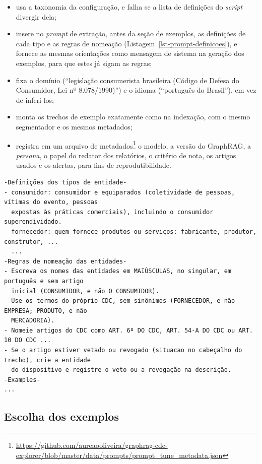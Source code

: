 \begin{itemize}
    \item usa a taxonomia da configuração, e falha se a lista de definições do \textit{script} divergir dela;
    \item insere no \textit{prompt} de extração, antes da seção de exemplos, as definições de cada tipo e as regras de nomeação (Listagem~\ref{lst-prompt-definicoes}), e fornece as mesmas orientações como mensagem de sistema na geração dos exemplos, para que estes já sigam as regras;
    \item fixa o domínio (``legislação consumerista brasileira (Código de Defesa do Consumidor, Lei nº 8.078/1990)'') e o idioma (``português do Brasil''), em vez de inferi-los;
    \item monta os trechos de exemplo exatamente como na indexação, com o mesmo segmentador e os mesmos metadados;
    \item registra em um arquivo de metadados\footnote{\url{https://github.com/aureaooliveira/graphrag-cdc-explorer/blob/master/data/prompts/prompt_tune_metadata.json}} o modelo, a versão do GraphRAG, a \textit{persona}, o papel do redator dos relatórios, o critério de nota, os artigos usados e os alertas, para fins de reprodutibilidade.
\end{itemize}

\begin{lstlisting}[caption={Trecho do \textit{prompt} de extração com as seções acrescentadas pelo \textit{script} de ajuste (abreviado).}, label=lst-prompt-definicoes]
-Definições dos tipos de entidade-
- consumidor: consumidor e equiparados (coletividade de pessoas, vítimas do evento, pessoas
  expostas às práticas comerciais), incluindo o consumidor superendividado.
- fornecedor: quem fornece produtos ou serviços: fabricante, produtor, construtor, ...
  ...
-Regras de nomeação das entidades-
- Escreva os nomes das entidades em MAIÚSCULAS, no singular, em português e sem artigo
  inicial (CONSUMIDOR, e não O CONSUMIDOR).
- Use os termos do próprio CDC, sem sinônimos (FORNECEDOR, e não EMPRESA; PRODUTO, e não
  MERCADORIA).
- Nomeie artigos do CDC como ART. 6º DO CDC, ART. 54-A DO CDC ou ART. 10 DO CDC ...
- Se o artigo estiver vetado ou revogado (situacao no cabeçalho do trecho), crie a entidade
  do dispositivo e registre o veto ou a revogação na descrição.
-Examples-
...
\end{lstlisting}

\subsection{Escolha dos exemplos}
\label{sec-indexacao-prompts-exemplos}


